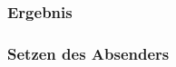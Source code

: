 \documentclass[12pt,ngerman]{beamer}
\begin{document}
\begin{frame}[plain]
\frametitle{Ergebnis}

\begin{center}
\end{center}
\end{frame}

\begin{frame}[fragile]
\frametitle{Setzen des Absenders}



\end{frame}
\end{document}
